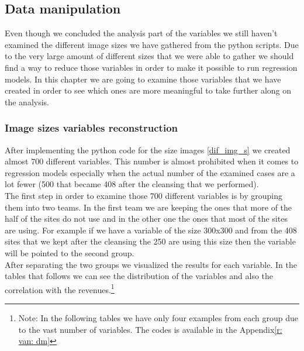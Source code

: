 \documentclass{book}
\begin{document}
\subsection{Data manipulation}
Even though we concluded the analysis part of the variables we still haven't examined the different image sizes we have gathered from the python scripts. Due to the very large amount of different sizes that we were able to gather we should find a way to reduce those variables in order to make it possible to run regression models. In this chapter we are going to examine those variables that we have created in order to see which ones are more meaningful to take further along on the analysis.
\subsubsection{Image sizes variables reconstruction}
After implementing the python code for the size images \ref{dif_img_s} we created almost 700 different variables. This number is almost prohibited when it comes to regression models especially when the actual number of the examined cases are a lot fewer (500 that became 408 after the cleansing that we performed).\\
The first step in order to examine those 700 different variables is by grouping them into two teams. In the first team we are keeping the ones that more of the half of the sites do not use and in the other one the ones that most of the sites are using. For example if we have a variable of the size 300x300 and from the 408 sites that we kept after the cleansing the 250 are using this size then the variable will be pointed to the second group.\\
After separating the two groups we visualized the results for each variable. In the tables that follows we can see the distribution of the variables and also the correlation with the revenues.\footnote{Note: In the following tables we have only four examples from each group due to the vast number of variables. The codes is available in the Appendix\ref{r: van: dm}}
\end{document}
